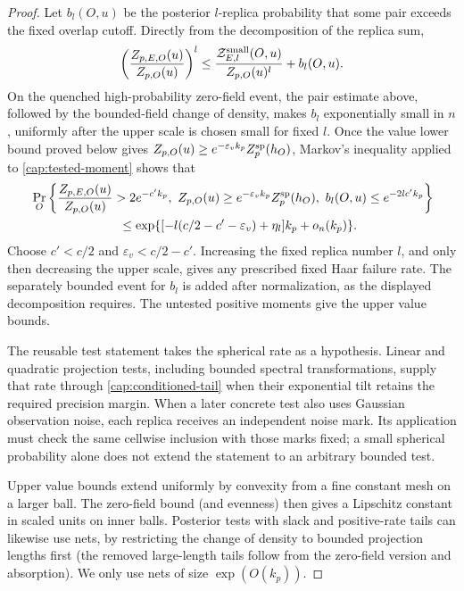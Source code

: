 \begin{proof}
Let \(b_l(O,u)\) be the posterior \(l\)-replica probability that some pair
exceeds the fixed overlap cutoff. Directly from the decomposition of the
replica sum,
\[
 \left(\frac{Z_{p,E,O}(u)}{Z_{p,O}(u)}\right)^l
 \le \frac{\mathcal Z_{E,l}^{\rm small}(O,u)}{Z_{p,O}(u)^l}
       +b_l(O,u).
\]
On the quenched high-probability zero-field event, the pair estimate above,
followed by the bounded-field change of density, makes \(b_l\) exponentially
small in \(n\), uniformly after the upper scale is chosen small for fixed
\(l\). Once the value lower bound
proved below gives \(Z_{p,O}(u)\ge e^{-\varepsilon_v k_p}Z_p^{\rm sp}(h_O)\),
Markov's inequality applied to \eqref{cap:tested-moment} shows that
\begin{align}\label{cap:tested-transfer}
 &\Pr_O\left\{
 \frac{Z_{p,E,O}(u)}{Z_{p,O}(u)}>2e^{-c'k_p},\
 Z_{p,O}(u)\ge e^{-\varepsilon_v k_p}Z_p^{\rm sp}(h_O),\
 b_l(O,u)\le e^{-2lc'k_p}\right\}\nonumber\\
 &\hspace{25mm}\le
 \exp\{[-l(c/2-c'-\varepsilon_v)+\eta_l]k_p+o_n(k_p)\}.
\end{align}
Choose \(c'<c/2\) and \(\varepsilon_v<c/2-c'\). Increasing the fixed
replica number \(l\), and only then decreasing the upper scale, gives any
prescribed fixed Haar failure rate. The separately bounded event for \(b_l\)
is added after normalization, as the displayed decomposition requires.
The untested positive moments give the upper value bounds.

The reusable test statement takes the spherical rate as a hypothesis.
Linear and quadratic projection tests, including bounded spectral
transformations, supply that rate through \eqref{cap:conditioned-tail}
when their exponential tilt retains the required precision margin.
When a later concrete test also uses Gaussian observation noise, each
replica receives an independent noise mark. Its application must check the
same cellwise inclusion with those marks fixed; a small spherical probability
alone does not extend the statement to an arbitrary bounded test.

Upper value bounds extend uniformly by convexity from a fine constant mesh on
a larger ball. The zero-field bound (and evenness) then gives a Lipschitz
constant in scaled units on inner balls. Posterior tests with slack and
positive-rate tails can likewise use nets, by restricting the change of
density to bounded projection lengths first (the removed large-length tails
follow from the zero-field version and absorption). We only use nets of size
\(\exp(O(k_p))\).


\end{proof}
